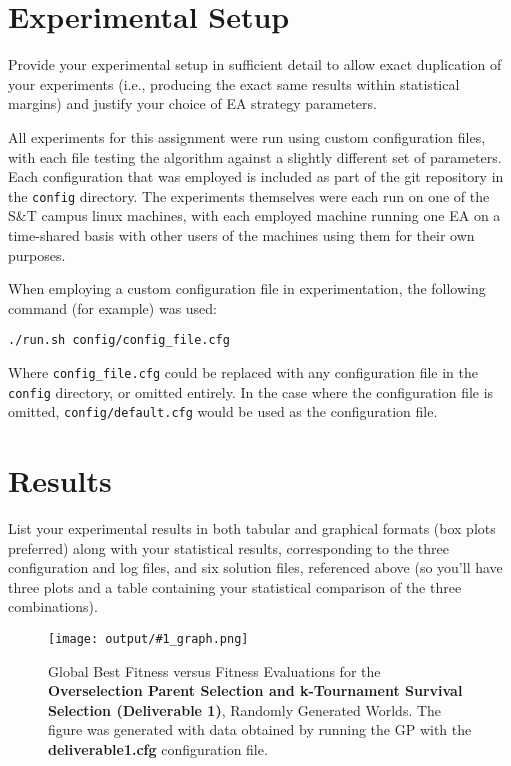 \documentclass[11pt]{article}
\newcommand{\fitnessplotcaption}[2]{\caption{Global Best Fitness versus Fitness Evaluations for the \textbf{{#1}}, Randomly Generated Worlds. The figure was generated with data obtained by running the GP with the \textbf{{#2}} configuration file.}}
\newcommand{\addgraphic}[1]{\centerline{\texttt{[image: output/\#1\_graph.png]}}}
\begin{document}
\section{Experimental Setup}
Provide your experimental setup in sufficient detail to allow exact duplication
of your experiments (i.e., producing the exact same results within statistical margins) and justify
your choice of EA strategy parameters.

All experiments for this assignment were run using custom configuration files, with each file
testing the algorithm against a slightly different set of parameters. Each configuration that was employed is included
as part of the git repository in the \texttt{config} directory. The experiments themselves were each run on one of the S\&T campus
linux machines, with each employed machine running one EA on a time-shared basis with other users of the machines using them for their own
purposes. 

When employing a custom configuration file in experimentation, the following command (for example) was used:

\vspace{5mm}

{\centering \texttt{./run.sh config/config\_file.cfg}\par }

\vspace{5mm}

Where \texttt{config\_file.cfg} could be replaced with any configuration file in the \texttt{config} directory, or
omitted entirely. In the case where the configuration file is omitted, \texttt{config/default.cfg} would be used 
as the configuration file.

\section{Results}
List your experimental results in both tabular and graphical formats (box plots preferred)
along with your statistical results, corresponding to the three configuration and log files, and six
solution files, referenced above (so you’ll have three plots and a table containing your statistical
comparison of the three combinations).

\begin{figure}[H]
    \addgraphic{deliverable1}
    \fitnessplotcaption{Overselection Parent Selection and  k-Tournament Survival Selection (Deliverable 1)}{deliverable1.cfg}
    \label{fig:deliverable1}
\end{figure}
\end{document}
